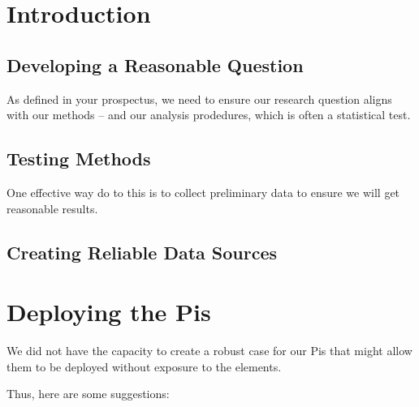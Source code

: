\documentclass{article}\usepackage[]{graphicx}\usepackage[]{xcolor}
\begin{document}
\section{Introduction}

\subsection{Developing a Reasonable Question}

As defined in your prospectus, we need to ensure our research question aligns with our methods -- and our analysis prodedures, which is often a statistical test. 

\subsection{Testing Methods}

One effective way do to this is to collect preliminary data to ensure we will get reasonable results. 

\subsection{Creating Reliable Data Sources}

\section{Deploying the Pis}

We did not have the capacity to create a robust case for our Pis that might allow them to be deployed without exposure to the elements. 

Thus, here are some suggestions:
\end{document}
